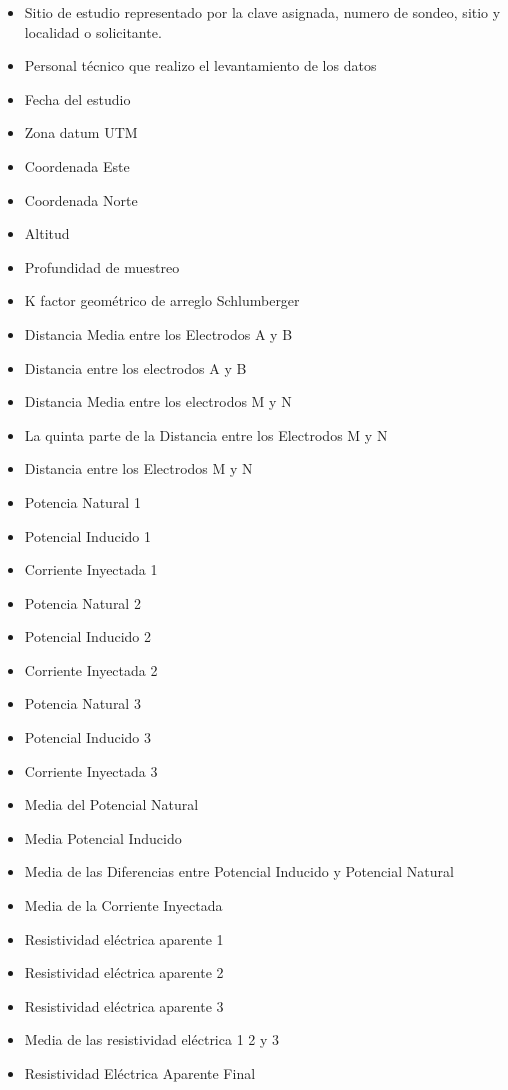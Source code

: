 \documentclass[sn-mathphys,Numbered]{sn-jnl}%
\theoremstyle{thmstyleone}%
\theoremstyle{thmstyletwo}%
\theoremstyle{thmstylethree}%
\begin{document}
\begin{itemize} 
	\item  Sitio de estudio representado por la clave asignada, numero de sondeo, sitio y localidad o solicitante.
	\item  Personal técnico que realizo el levantamiento de los datos
	\item  Fecha del estudio
	\item  Zona datum UTM
	\item  Coordenada Este 
	\item  Coordenada Norte
	\item  Altitud 
	\item  Profundidad de muestreo
	\item  K factor geométrico de arreglo Schlumberger
	\item  Distancia Media entre los Electrodos A y B 
	\item  Distancia entre los electrodos A y B
	\item  Distancia Media entre los electrodos M y N
	\item  La quinta parte de la Distancia entre los Electrodos M y N
	\item  Distancia entre los Electrodos M y N
	\item  Potencia Natural 1
	\item  Potencial Inducido 1
	\item  Corriente Inyectada 1
	\item  Potencia Natural 2
	\item  Potencial Inducido 2
	\item  Corriente Inyectada 2
	\item  Potencia Natural 3
	\item  Potencial Inducido 3
	\item  Corriente Inyectada 3
	\item  Media del Potencial Natural
	\item  Media Potencial Inducido
	\item  Media de las Diferencias entre Potencial Inducido y Potencial Natural
	\item  Media de la Corriente Inyectada
	\item  Resistividad eléctrica aparente 1
	\item  Resistividad eléctrica aparente 2
	\item  Resistividad eléctrica aparente 3
	\item  Media de las resistividad eléctrica 1 2 y 3
	\item  Resistividad Eléctrica Aparente Final
\end{itemize}
\end{document}
